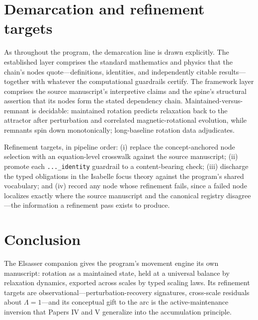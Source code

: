 \documentclass[11pt]{article}
\theoremstyle{remark}
\begin{document}
\section{Demarcation and refinement targets}
\label{sec:demarc}

As throughout the program, the demarcation line is drawn explicitly. The established layer comprises the standard mathematics and physics that the chain's nodes quote---definitions, identities, and independently citable results---together with whatever the computational guardrails certify. The framework layer comprises the source manuscript's interpretive claims and the spine's structural assertion that its nodes form the stated dependency chain. Maintained-versus-remnant is decidable: maintained rotation predicts relaxation back to the attractor after perturbation and correlated magnetic-rotational evolution, while remnants spin down monotonically; long-baseline rotation data adjudicates.

Refinement targets, in pipeline order: (i) replace the concept-anchored node selection with an equation-level crosswalk against the source manuscript; (ii) promote each \texttt{...\_identity} guardrail to a content-bearing check; (iii) discharge the typed obligations in the Isabelle focus theory against the program's shared vocabulary; and (iv) record any node whose refinement fails, since a failed node localizes exactly where the source manuscript and the canonical registry disagree---the information a refinement pass exists to produce.

\section{Conclusion}
\label{sec:conc}

The Elsasser companion gives the program's movement engine its own manuscript: rotation as a maintained state, held at a universal balance by relaxation dynamics, exported across scales by typed scaling laws. Its refinement targets are observational---perturbation-recovery signatures, cross-scale residuals about $\Lambda = 1$---and its conceptual gift to the arc is the active-maintenance inversion that Papers IV and V generalize into the accumulation principle.
\end{document}
